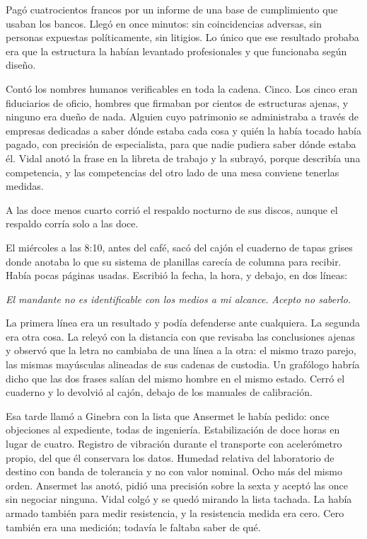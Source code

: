 Pagó cuatrocientos francos por un informe de una base de cumplimiento que usaban los bancos. Llegó en once minutos: sin coincidencias adversas, sin personas expuestas políticamente, sin litigios. Lo único que ese resultado probaba era que la estructura la habían levantado profesionales y que funcionaba según diseño.

Contó los nombres humanos verificables en toda la cadena. Cinco. Los cinco eran fiduciarios de oficio, hombres que firmaban por cientos de estructuras ajenas, y ninguno era dueño de nada. Alguien cuyo patrimonio se administraba a través de empresas dedicadas a saber dónde estaba cada cosa y quién la había tocado había pagado, con precisión de especialista, para que nadie pudiera saber dónde estaba él. Vidal anotó la frase en la libreta de trabajo y la subrayó, porque describía una competencia, y las competencias del otro lado de una mesa conviene tenerlas medidas.

A las doce menos cuarto corrió el respaldo nocturno de sus discos, aunque el respaldo corría solo a las doce.

El miércoles a las 8:10, antes del café, sacó del cajón el cuaderno de tapas grises donde anotaba lo que su sistema de planillas carecía de columna para recibir. Había pocas páginas usadas. Escribió la fecha, la hora, y debajo, en dos líneas:

\textit{El mandante no es identificable con los medios a mi alcance.}
\textit{Acepto no saberlo.}

La primera línea era un resultado y podía defenderse ante cualquiera. La segunda era otra cosa. La releyó con la distancia con que revisaba las conclusiones ajenas y observó que la letra no cambiaba de una línea a la otra: el mismo trazo parejo, las mismas mayúsculas alineadas de sus cadenas de custodia. Un grafólogo habría dicho que las dos frases salían del mismo hombre en el mismo estado. Cerró el cuaderno y lo devolvió al cajón, debajo de los manuales de calibración.

Esa tarde llamó a Ginebra con la lista que Ansermet le había pedido: once objeciones al expediente, todas de ingeniería. Estabilización de doce horas en lugar de cuatro. Registro de vibración durante el transporte con acelerómetro propio, del que él conservara los datos. Humedad relativa del laboratorio de destino con banda de tolerancia y no con valor nominal. Ocho más del mismo orden. Ansermet las anotó, pidió una precisión sobre la sexta y aceptó las once sin negociar ninguna. Vidal colgó y se quedó mirando la lista tachada. La había armado también para medir resistencia, y la resistencia medida era cero. Cero también era una medición; todavía le faltaba saber de qué.

